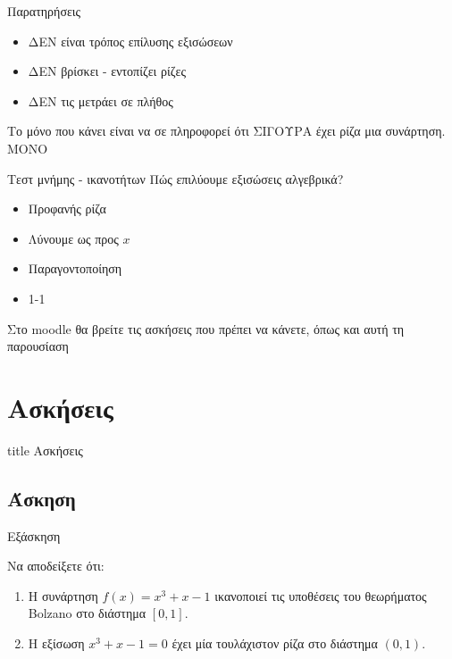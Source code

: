 \documentclass[greek]{beamer}
\newcounter{askisi} %
\newenvironment{askisi}
{
  \refstepcounter{askisi}\par
  \subsection{Άσκηση \theaskisi}
  \begin{frame}[label=Άσκηση\theaskisi,t]{Εξάσκηση \theaskisi}
}{
  \end{frame}
}
\begin{document}
\begin{frame}{Παρατηρήσεις}
    \begin{itemize}
        \item<1-> ΔΕΝ είναι τρόπος επίλυσης εξισώσεων
        \item<2-> ΔΕΝ βρίσκει - εντοπίζει ρίζες
        \item<3-> ΔΕΝ τις μετράει σε πλήθος
    \end{itemize}
    Το μόνο που κάνει είναι να σε πληροφορεί ότι ΣΙΓΟΥΡΑ έχει ρίζα μια συνάρτηση.  ΜΟΝΟ
\end{frame}

\begin{frame}{Τεστ μνήμης - ικανοτήτων}
    Πώς επιλύουμε εξισώσεις αλγεβρικά?
    \begin{itemize}
        \item<1-> Προφανής ρίζα
        \item<2-> Λύνουμε ως προς $x$
        \item<3-> Παραγοντοποίηση
        \item<4-> 1-1
    \end{itemize}
\end{frame}

\begin{frame}[noframenumbering]
    Στο moodle θα βρείτε τις ασκήσεις που πρέπει να κάνετε, όπως και αυτή τη παρουσίαση
\end{frame}

\section{Ασκήσεις}

\begin{frame}[noframenumbering]
    \vfill
    \centering
    \begin{beamercolorbox}[sep=8pt,center,shadow=true,rounded=true]{title}
        Ασκήσεις
    \end{beamercolorbox}
    \vfill
\end{frame}

\begin{askisi}
    Να αποδείξετε ότι:
    \begin{enumerate}
        \item<1-> Η συνάρτηση $f(x)=x^3+x-1$ ικανοποιεί τις υποθέσεις του θεωρήματος Bolzano στο διάστημα $[0,1]$.
        \item<2-> Η εξίσωση $x^3+x-1=0$ έχει μία τουλάχιστον ρίζα στο διάστημα $(0,1)$.
    \end{enumerate}

\end{askisi}
\end{document}
